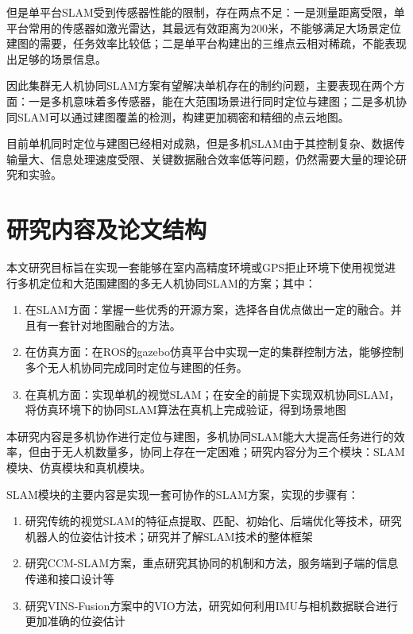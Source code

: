 但是单平台SLAM受到传感器性能的限制，存在两点不足：一是测量距离受限，单平台常用的传感器如激光雷达，其最远有效距离为200米，不能够满足大场景定位建图的需要，任务效率比较低；二是单平台构建出的三维点云相对稀疏，不能表现出足够的场景信息\cite{高家隆2019多无人机协同定位与建图技术研究}。

因此集群无人机协同SLAM方案有望解决单机存在的制约问题，主要表现在两个方面：一是多机意味着多传感器，能在大范围场景进行同时定位与建图；二是多机协同SLAM可以通过建图覆盖的检测，构建更加稠密和精细的点云地图。

目前单机同时定位与建图已经相对成熟，但是多机SLAM由于其控制复杂、数据传输量大、信息处理速度受限、关键数据融合效率低等问题，仍然需要大量的理论研究和实验。

\section{研究内容及论文结构}
本文研究目标旨在实现一套能够在室内高精度环境或GPS拒止环境下使用视觉进行多机定位和大范围建图的多无人机协同SLAM的方案；其中：

\begin{enumerate}
	\item 在SLAM方面：掌握一些优秀的开源方案，选择各自优点做出一定的融合。并且有一套针对地图融合的方法。
	\item 在仿真方面：在ROS的gazebo仿真平台中实现一定的集群控制方法，能够控制多个无人机协同完成同时定位与建图的任务。
	\item 在真机方面：实现单机的视觉SLAM；在安全的前提下实现双机协同SLAM，将仿真环境下的协同SLAM算法在真机上完成验证，得到场景地图
\end{enumerate}

本研究内容是多机协作进行定位与建图，多机协同SLAM能大大提高任务进行的效率，但由于无人机数量多，协同上存在一定困难；研究内容分为三个模块：SLAM模块、仿真模块和真机模块。

SLAM模块的主要内容是实现一套可协作的SLAM方案，实现的步骤有：

\begin{enumerate}
	\item 研究传统的视觉SLAM的特征点提取、匹配、初始化、后端优化等技术，研究机器人的位姿估计技术；研究并了解SLAM技术的整体框架
	\item 研究CCM-SLAM方案，重点研究其协同的机制和方法，服务端到子端的信息传递和接口设计等
	\item 研究VINS-Fusion方案中的VIO方法，研究如何利用IMU与相机数据联合进行更加准确的位姿估计
\end{enumerate}

